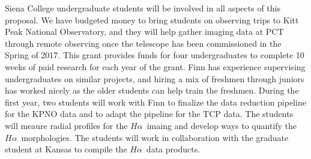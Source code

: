 \documentclass[11pt, preprint]{aastex}
\newcommand{\ha}{$H\alpha$}
\begin{document}
{%


Siena College undergraduate students will be involved in all aspects
of this proposal.  We have budgeted money to bring students on
observing trips to Kitt Peak National Observatory, and they will help
gather imaging data at PCT through remote observing once the telescope
has been commissioned in the Spring of 2017.  This grant provides funds for four
undergraduates to complete 10 weeks of paid research for each year of
the grant.  Finn has experience supervising undergraduates on similar
projects, and hiring a mix of freshmen through juniors has worked
nicely as the older students can help train the freshmen.  
During the first year, two students will work with Finn to
finalize the data reduction pipeline for the KPNO data and to adapt
the pipeline for the TCP data.  The students will meaure radial
profiles for the \ha \ imaing and develop ways to quantify the \ha \
morphologies.  The students will work in collaboration with the
graduate student at Kansas to compile the \ha \ data products.

}
\end{document}
